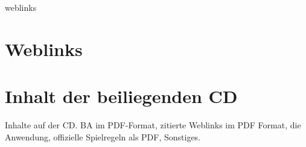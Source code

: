 \documentclass[
							a4paper, 
							11pt, 
							openany, 
							liststotoc,
							parskip=half, 
   							headings=normal
						]{scrreprt}
\begin{document}
\clearpage
\begin{btSect}{weblinks}
\section*{Weblinks}
\btPrintCited
\end{btSect}

\listoftables



\renewcommand{\thesection}{\Alph{section}}
\appendix
{}
\section{Inhalt der beiliegenden CD}
Inhalte auf der CD. BA im PDF-Format, zitierte Weblinks im PDF Format, die Anwendung, offizielle Spielregeln als PDF, Sonstiges.



\end{document}
